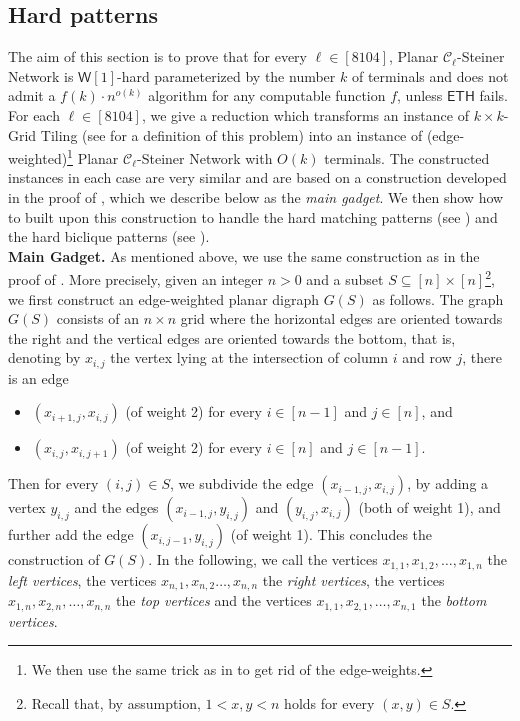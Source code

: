 \subsection{Hard patterns}

The aim of this section is to prove that for every $\ell \in [8104]$, {\sc Planar $\mathcal{C}_\ell$-Steiner Network} 
is $\mathsf{W}[1]$-hard parameterized by the number $k$ of terminals and does not admit a
$f(k) \cdot n^{o(k)}$ algorithm for any computable function $f$, unless $\mathsf{ETH}$ fails.
For each $\ell \in [8104]$, we give a reduction which transforms an instance of {\sc $k \times k$-Grid Tiling} (see  for a definition of this problem) into an instance of (edge-weighted)\footnote{We then use the same trick as in  to get rid of the edge-weights.} {\sc Planar $\mathcal{C}_\ell$-Steiner Network} with $O(k)$ terminals.
The constructed instances in each case are very similar and are based on a construction developed in the proof of \cite[Theorem 1.4]{ChitnisFHM20}, which we describe below as the \emph{main gadget}. We then show how to built upon this construction to handle the hard matching patterns (see ) and the hard biclique patterns (see ).\\

\noindent
\textbf{Main Gadget.} As mentioned above, we use the same construction as in the proof of \cite[Theorem 1.4]{ChitnisFHM20}. More precisely, given an integer $n > 0$ and a subset $S \subseteq [n] \times [n]$\footnote{Recall that, by assumption, $1 < x,y< n$ holds for every $(x,y) \in S$.}, we first construct an edge-weighted planar digraph $G(S)$ as follows. The graph $G(S)$ consists of an $n \times n$ grid where the horizontal edges are oriented towards the right and the vertical edges are oriented towards the bottom, that is, denoting by $x_{i,j}$ the vertex lying at the intersection of column $i$ and row $j$, there is an edge 
\begin{itemize}
\item $(x_{i+1,j},x_{i,j})$ (of weight 2) for every $i \in [n-1]$ and $j \in [n]$, and 
\item $(x_{i,j},x_{i,j+1})$ (of weight 2) for every $i \in [n]$ and $j \in [n-1]$. 
\end{itemize}
Then for every $(i,j) \in S$, we subdivide the edge $(x_{i-1,j},x_{i,j})$, by adding a vertex $y_{i,j}$ and the edges $(x_{i-1,j},y_{i,j})$ and $(y_{i,j},x_{i,j})$ (both of weight 1), and further add the edge $(x_{i,j-1},y_{i,j})$ (of weight 1). 
This concludes the construction of $G(S)$.
In the following, we call the vertices $x_{1,1},x_{1,2},\ldots,x_{1,n}$ the \emph{left vertices}, the vertices $x_{n,1}, x_{n,2}\ldots,x_{n,n}$ the \emph{right vertices}, the vertices $x_{1,n},x_{2,n}, \ldots,x_{n,n}$ the \emph{top vertices} and the vertices $x_{1,1},x_{2,1},\ldots, x_{n,1}$ the \emph{bottom vertices}. \\

